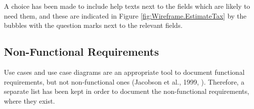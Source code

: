 A choice has been made to include help texts next to the fields which are
likely to need them, and these are indicated in Figure
\ref{fig:Wireframe.EstimateTax} by the bubbles with the question marks next to
the relevant fields.

\subsection{Non-Functional Requirements} \label{sec:Requirements.NonFunctionalRequirements}
Use cases and use case diagrams are an appropriate tool to document functional
requirements, but not non-functional ones (Jacobson et al., 1999,
\cite[cited][p.~153]{bennett2010object}). Therefore, a separate list has been
kept in order to document the non-functional requirements, where they exist.
